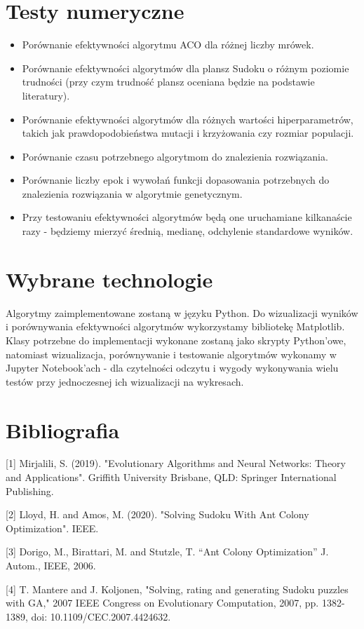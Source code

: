 \documentclass[11pt]{scrartcl} %
\begin{document}
\section{Testy numeryczne}
\begin{itemize}
\item Porównanie efektywności algorytmu ACO dla różnej liczby mrówek.
\item Porównanie efektywności algorytmów dla plansz Sudoku o różnym poziomie trudności (przy czym trudność plansz oceniana będzie na podstawie literatury).
\item Porównanie efektywności algorytmów dla różnych wartości hiperparametrów, takich jak prawdopodobieństwa mutacji i krzyżowania czy rozmiar populacji.
\item Porównanie czasu potrzebnego algorytmom do znalezienia rozwiązania.
\item Porównanie liczby epok i wywołań funkcji dopasowania potrzebnych do znalezienia rozwiązania w algorytmie genetycznym.
\item Przy testowaniu efektywności algorytmów będą one uruchamiane kilkanaście razy - będziemy mierzyć średnią, medianę, odchylenie standardowe wyników.
\end{itemize}

\section{Wybrane technologie}
Algorytmy zaimplementowane zostaną w języku Python. Do wizualizacji wyników i porównywania efektywności algorytmów wykorzystamy bibliotekę Matplotlib. Klasy potrzebne do implementacji wykonane zostaną jako skrypty Python'owe, natomiast wizualizacja, porównywanie i testowanie algorytmów wykonamy w Jupyter Notebook'ach - dla czytelności odczytu i wygody wykonywania wielu testów przy jednoczesnej ich wizualizacji na wykresach.

\section{Bibliografia}
[1] Mirjalili, S. (2019). "Evolutionary Algorithms and Neural Networks: Theory and Applications". Griffith University Brisbane, QLD: Springer International Publishing.

[2] Lloyd, H. and Amos, M. (2020). "Solving Sudoku With Ant Colony Optimization". IEEE.

[3] Dorigo, M., Birattari, M. and Stutzle, T. “Ant Colony Optimization” J. Autom., IEEE, 2006.

[4] T. Mantere and J. Koljonen, "Solving, rating and generating Sudoku puzzles with GA," 2007 IEEE Congress on Evolutionary Computation, 2007, pp. 1382-1389, doi: 10.1109/CEC.2007.4424632.
\end{document}
